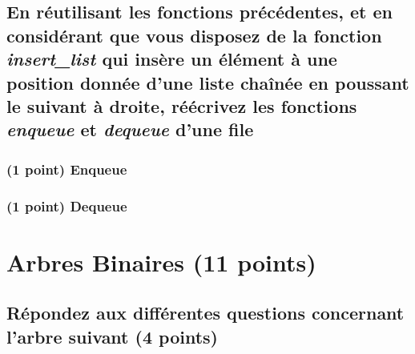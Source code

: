 \documentclass[11pt,a4paper]{article}
\begin{document}

\clearpage



\subsection{En réutilisant les fonctions précédentes, et en considérant que vous disposez de la fonction \textit{insert\_list} qui insère un élément à une position donnée d'une liste chaînée en poussant le suivant à droite, réécrivez les fonctions \textit{enqueue} et \textit{dequeue} d'une file }

\subsubsection{(1 point) Enqueue }



\subsubsection{(1 point) Dequeue }


\clearpage


\section{Arbres Binaires (11 points)}

\subsection{Répondez aux différentes questions concernant l'arbre suivant (4 points) }

\bigskip
\end{document}
